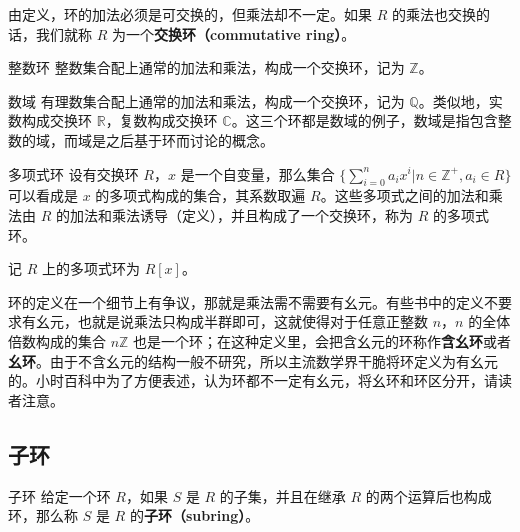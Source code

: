 由定义，环的加法必须是可交换的，但乘法却不一定。如果 $R$ 的乘法也交换的话，我们就称 $R$ 为一个\textbf{交换环（commutative ring）}。

\begin{example}{整数环}
整数集合配上通常的加法和乘法，构成一个交换环，记为 $\mathbb{Z}$。
\end{example}

\begin{example}{数域}
有理数集合配上通常的加法和乘法，构成一个交换环，记为 $\mathbb{Q}$。类似地，实数构成交换环 $\mathbb{R}$，复数构成交换环 $\mathbb{C}$。这三个环都是数域的例子，数域是指包含整数的域，而域是之后基于环而讨论的概念。
\end{example}

\begin{example}{多项式环}\label{ex_Ring_1}
设有交换环 $R$，$x$ 是一个自变量，那么集合 $\{\sum\limits_{i=0}^n a_ix^i|n\in\mathbb{Z}^+, a_i\in R\}$ 可以看成是 $x$ 的多项式构成的集合，其系数取遍 $R$。这些多项式之间的加法和乘法由 $R$ 的加法和乘法诱导（定义），并且构成了一个交换环，称为 $R$ 的多项式环。

记 $R$ 上的多项式环为 $R[x]$。
\end{example}

环的定义在一个细节上有争议，那就是乘法需不需要有幺元。有些书中的定义不要求有幺元，也就是说乘法只构成半群即可，这就使得对于任意正整数 $n$，$n$ 的全体倍数构成的集合 $n\mathbb{Z}$ 也是一个环；在这种定义里，会把含幺元的环称作\textbf{含幺环}或者\textbf{幺环}。由于不含幺元的结构一般不研究，所以主流数学界干脆将环定义为有幺元的。小时百科中为了方便表述，认为环都不一定有幺元，将幺环和环区分开，请读者注意。

\subsection{子环}

\begin{definition}{子环}
给定一个环 $R$，如果 $S$ 是 $R$ 的子集，并且在继承 $R$ 的两个运算后也构成环，那么称 $S$ 是 $R$ 的\textbf{子环（subring）}。
\end{definition}



